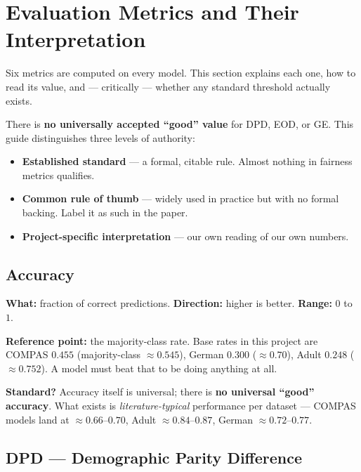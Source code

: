 \section{Evaluation Metrics and Their Interpretation}

Six metrics are computed on every model. This section explains each one, how to
read its value, and --- critically --- whether any standard threshold actually
exists.

\begin{warnbox}
There is \textbf{no universally accepted ``good'' value} for DPD, EOD, or GE.
This guide distinguishes three levels of authority:
\begin{itemize}
\item \textbf{Established standard} --- a formal, citable rule. Almost nothing
in fairness metrics qualifies.
\item \textbf{Common rule of thumb} --- widely used in practice but with no
formal backing. Label it as such in the paper.
\item \textbf{Project-specific interpretation} --- our own reading of our own
numbers.
\end{itemize}
\end{warnbox}

\subsection{Accuracy}

\textbf{What:} fraction of correct predictions.
\textbf{Direction:} higher is better.
\textbf{Range:} $0$ to $1$.

\textbf{Reference point:} the majority-class rate. Base rates in this project
are COMPAS $0.455$ (majority-class $\approx 0.545$), German $0.300$
($\approx 0.70$), Adult $0.248$ ($\approx 0.752$). A model must beat that to be
doing anything at all.

\textbf{Standard?} Accuracy itself is universal; there is \textbf{no universal
``good'' accuracy}. What exists is \emph{literature-typical} performance per
dataset --- COMPAS models land at $\approx 0.66$--$0.70$, Adult
$\approx 0.84$--$0.87$, German $\approx 0.72$--$0.77$.

\subsection{DPD --- Demographic Parity Difference}


